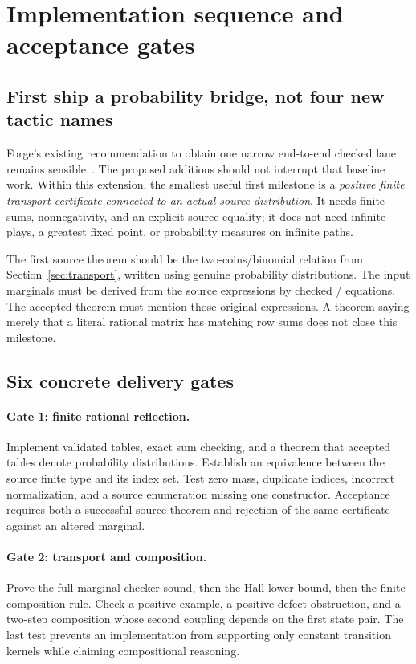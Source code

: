 \section{Implementation sequence and acceptance gates}
\label{sec:development}

\subsection{First ship a probability bridge, not four new tactic names}

Forge's existing recommendation to obtain one narrow end-to-end checked lane
remains sensible~\cite{forge-conclusion}. The proposed additions should not
interrupt that baseline work. Within this extension, the smallest useful first
milestone is a \emph{positive finite transport certificate connected to an
actual source distribution}. It needs finite sums, nonnegativity, and an
explicit source equality; it does not need infinite plays, a greatest fixed
point, or probability measures on infinite paths.

The first source theorem should be the two-coins/binomial relation from
Section~\ref{sec:transport}, written using genuine probability distributions.
The input marginals must be derived from the source expressions by checked
/ equations. The accepted theorem must mention those
original expressions. A theorem saying merely that a literal rational matrix
has matching row sums does not close this milestone.

\subsection{Six concrete delivery gates}

\paragraph{Gate 1: finite rational reflection.}
Implement validated tables, exact sum checking, and a theorem that accepted
tables denote probability distributions. Establish an equivalence between the
source finite type and its index set. Test zero mass, duplicate indices,
incorrect normalization, and a source enumeration missing one constructor.
Acceptance requires both a successful source theorem and rejection of the
same certificate against an altered marginal.

\paragraph{Gate 2: transport and composition.}
Prove the full-marginal checker sound, then the Hall lower bound, then the
finite  composition rule. Check a positive example, a positive-defect
obstruction, and a two-step composition whose second coupling depends on the
first state pair. The last test prevents an implementation from supporting
only constant transition kernels while claiming compositional reasoning.

